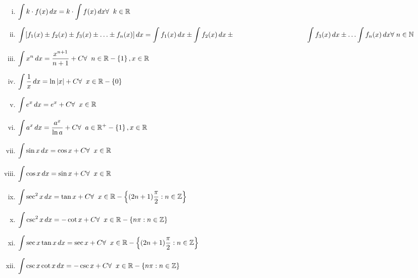 \documentclass{article}
\begin{document}
\begin{enumerate}[i.]
    \item $\displaystyle\int k\cdot f(x) \, dx = k \cdot \displaystyle\int f(x) \, dx \hfill \forall \hspace{2mm} k \in \mathbb{R}$
    \item $\displaystyle\int [f_{1}(x)\pm f_{2}(x)\pm f_{3}(x)\pm \ldots \pm f_{n}(x)] \, dx= \displaystyle\int f_{1}(x) \, dx\pm \displaystyle\int f_{2}(x) \, dx\pm \hphantom{1cm}\hspace{3cm} \displaystyle\int f_{3}(x) \, dx \pm \ldots \displaystyle\int f_{n}(x) \, dx \hfill \forall \hspace{1mm} n \in \mathbb{N} $
    \item $\displaystyle\int x^n \, dx=\dfrac{x^{n+1}}{n+1} +C \hfill \forall \hspace{2mm} n \in \mathbb{R}-\left\{1\right\}, x \in \mathbb{R}$
    \item $\displaystyle\int \dfrac{1}{x} \, dx=\ln \abs{x} +C \hfill \forall \hspace{2mm} x \in \mathbb{R}- \left\{0\right\}$
    \item $\displaystyle\int e^x \, dx=e^x +C \hfill \forall \hspace{2mm} x \in \mathbb{R}$
    \item $\displaystyle\int a^x \, dx=\dfrac{a^x}{\ln a} +C \hfill \forall \hspace{2mm} a \in \mathbb{R}^+-\left\{1\right\}, x \in \mathbb{R}$
    \item $\displaystyle\int \sin x \, dx=\cos x +C \hfill \forall \hspace{2mm} x \in \mathbb{R}$
    \item $\displaystyle\int \cos x \, dx=\sin x +C \hfill \forall \hspace{2mm} x \in \mathbb{R}$
    \item $\displaystyle\int \sec^2 x \, dx=\tan x +C \hfill \forall \hspace{2mm} x \in \mathbb{R}-\left\{(2n+1)\dfrac{\pi}{2}:n \in \mathbb{Z}\right\}$
    \item $\displaystyle\int \csc^2 x \, dx=-\cot x +C \hfill \forall \hspace{2mm} x \in \mathbb{R}-\left\{n\pi:n \in \mathbb{Z}\right\}$
    \item $\displaystyle\int \sec x \tan x \, dx=\sec x +C \hfill \forall \hspace{2mm} x \in \mathbb{R}-\left\{(2n+1)\dfrac{\pi}{2}:n \in \mathbb{Z}\right\}$
    \item $\displaystyle\int \csc x \cot x \, dx=-\csc x +C \hfill \forall \hspace{2mm} x \in \mathbb{R}-\left\{n\pi:n\in \mathbb{Z}\right\}$

\end{enumerate}
\end{document}
